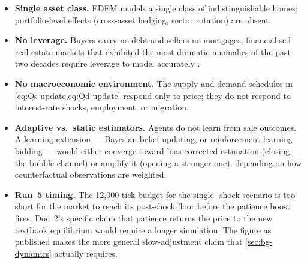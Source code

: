 \begin{itemize}[leftmargin=*]
\item \textbf{Single asset class.} EDEM models a single class of
      indistinguishable homes; portfolio-level effects (cross-asset
      hedging, sector rotation) are absent.
\item \textbf{No leverage.} Buyers carry no debt and sellers no
      mortgages; financialised real-estate markets that exhibited the
      most dramatic anomalies of the past two decades require leverage
      to model accurately \citep{geanakoplos2012leverage,baptista2016boe}.
\item \textbf{No macroeconomic environment.} The supply and demand
      schedules in \cref{eq:Qs-update,eq:Qd-update} respond only to
      price; they do not respond to interest-rate shocks, employment,
      or migration.
\item \textbf{Adaptive vs.\ static estimators.} Agents do not learn
      from sale outcomes. A learning extension --- Bayesian belief
      updating, or reinforcement-learning bidding --- would either
      converge toward bias-corrected estimation (closing the
      bubble channel) or amplify it (opening a stronger one),
      depending on how counterfactual observations are weighted.
\item \textbf{Run~5 timing.} The 12{,}000-tick budget for the single-
      shock scenario is too short for the market to reach its
      post-shock floor before the patience boost fires. Doc~2's
      specific claim that patience returns the price to the new
      textbook equilibrium would require a longer simulation.
      The figure as published makes the more general slow-adjustment
      claim that \cref{sec:bg-dynamics} actually requires.
\end{itemize}
